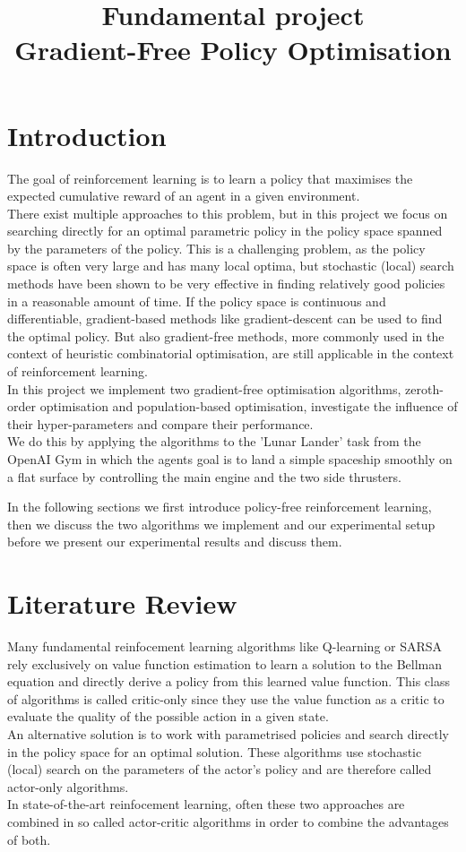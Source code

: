 \documentclass[10pt]{article}
\title{Fundamental project\\\LARGE Gradient-Free Policy Optimisation}
\begin{document}
\maketitle

\section{Introduction}
The goal of reinforcement learning is to learn a policy that maximises the expected cumulative
reward of an agent in a given environment.\\
There exist multiple approaches to this problem, but in this project
we focus on searching directly for an optimal parametric policy in the policy space
spanned by the parameters of the policy.
This is a challenging problem, as the policy space is often very large and has many local optima,
but stochastic (local) search methods have been shown to be very effective in finding relatively good policies in a reasonable amount of time.
If the policy space is continuous and differentiable, gradient-based methods like gradient-descent can be used to find the optimal policy.
But also gradient-free methods, more commonly used in the context of heuristic combinatorial
optimisation, are still applicable in the context of reinforcement learning.\\
In this project we implement two gradient-free optimisation algorithms, zeroth-order optimisation and population-based optimisation, investigate the influence of their hyper-parameters and compare their performance.\\
We do this by applying the algorithms to the 'Lunar Lander' task from the OpenAI Gym \cite{gym} in which
the agents goal is to land a simple spaceship smoothly on a flat surface by controlling the main engine and the two side thrusters.

In the following sections we first introduce policy-free reinforcement learning, then we discuss the two algorithms we implement and our experimental setup before we present our experimental results and
discuss them.

\section{Literature Review}

Many fundamental reinfocement learning algorithms like Q-learning or SARSA rely exclusively on value function
estimation to learn a solution to the Bellman equation and directly derive a policy from this learned value function. This class of algorithms is called critic-only since they use the value function as a critic to evaluate the quality of the possible action in a given state.\\
An alternative solution is to work with parametrised policies and search directly in the policy space
for an optimal solution. These algorithms use stochastic (local) search on the parameters of the
actor's policy and are therefore called actor-only algorithms.\\
In state-of-the-art reinfocement learning, often these two approaches are combined in so called actor-critic algorithms in order to combine the advantages of both.
\cite{slides}
\end{document}
